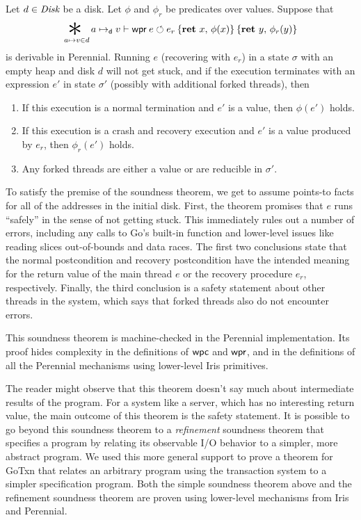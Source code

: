 \begin{theorem}
\label{thm:soundness}
  Let $d \in \textit{Disk}$ be a disk. Let $\phi$ and $\phi_r$ be predicates over
  values.
  Suppose that
  \[\bigast\limits_{a \mapsto v \in d} a \dmapsto v \proves
  \wpr{e}{e_r}{\Ret{x} \phi(x)}{\Ret{y} \phi_{r}(y)} \] is derivable in
  Perennial. Running $e$ (recovering with $e_{r}$) in a state $\sigma$ with an
  empty heap and disk $d$ will not get stuck, and if the execution
  terminates with an expression $e'$ in state $\sigma'$ (possibly
  with additional forked threads), then
  \begin{enumerate}
    \item If this execution is a normal termination and $e'$ is a value, then
    $\phi(e')$ holds.
    \item If this execution is a crash and recovery execution and $e'$ is a
    value produced by $e_{r}$, then $\phi_{r}(e')$ holds.
    \item Any forked threads are either a value or are reducible in $\sigma'$.
  \end{enumerate}
\end{theorem}
To satisfy the premise of the soundness theorem, we get to assume points-to
facts for all of the addresses in the initial disk. First, the theorem promises
that $e$ runs ``safely'' in the sense of not getting stuck. This immediately
rules out a number of errors, including any calls to Go's built-in 
function and lower-level issues like reading slices out-of-bounds and data
races.  The first two conclusions state that the normal postcondition and
recovery postcondition have the intended meaning for the return value of the
main thread $e$ or the recovery procedure $e_{r}$, respectively. Finally, the
third conclusion is a safety statement about other threads in the system, which
says that forked threads also do not encounter errors.

This soundness theorem is machine-checked in the Perennial implementation. Its
proof hides complexity in the definitions of $\textsf{\upshape wpc}$ and $\textsf{\upshape wpr}$, and in the
definitions of all the Perennial mechanisms using lower-level Iris primitives.

The reader might observe that this theorem doesn't say much about intermediate
results of the program. For a system like a server, which has no interesting
return value, the main outcome of this theorem is the safety statement.
It is possible to go beyond this soundness theorem to a \emph{refinement}
soundness theorem that specifies a program by relating its observable I/O
behavior to a simpler, more abstract program. We used this more general support
to prove a theorem for GoTxn that relates an arbitrary program using the
transaction system to a simpler specification program. Both the simple soundness
theorem above and the refinement soundness theorem are proven using lower-level
mechanisms from Iris and Perennial.

